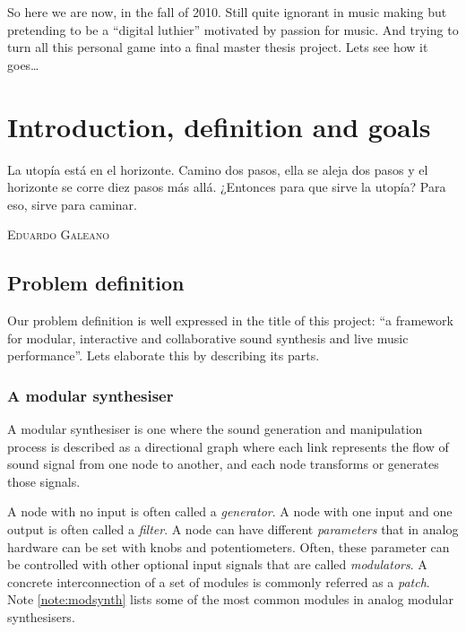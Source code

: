 So here we are now, in the fall of 2010. Still quite ignorant in music
making but pretending to be a ``digital luthier'' motivated by passion
for music. And trying to turn all this personal game into a final
master thesis project. Lets see how it goes\ldots

\chapter{Introduction, definition and goals}

\epigraph{La utopía está en el horizonte. Camino dos pasos, ella se
  aleja dos pasos y el horizonte se corre diez pasos más
  allá. ¿Entonces para que sirve la utopía? Para eso, sirve para
  caminar.}{\textsc{Eduardo Galeano}}

\section{Problem definition}

Our problem definition is well expressed in the title of this project:
``a framework for modular, interactive and collaborative sound
synthesis and live music performance''. Lets elaborate this by
describing its parts.

\subsection{A modular synthesiser}
\label{sec:defmodular}
A modular synthesiser is one where the sound generation and
manipulation process is described as a directional graph where each
link represents the flow of sound signal from one node to another, and
each node transforms or generates those signals.

A node with no input is often called a \emph{generator}. A node with
one input and one output is often called a \emph{filter}. A node can
have different \emph{parameters} that in analog hardware can be set
with knobs and potentiometers. Often, these parameter can be
controlled with other optional input signals that are called
\emph{modulators}. A concrete interconnection of a set of modules is
commonly referred as a \emph{patch}. Note \ref{note:modsynth} lists
some of the most common modules in analog modular synthesisers.

